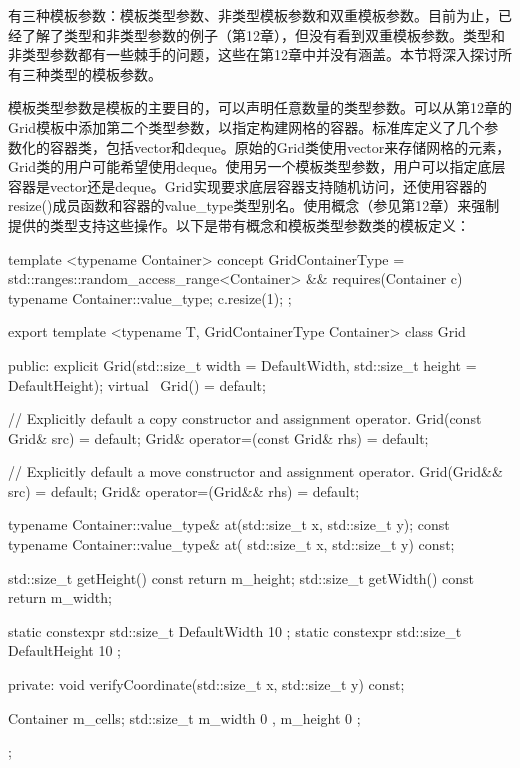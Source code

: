 
有三种模板参数：模板类型参数、非类型模板参数和双重模板参数。目前为止，已经了解了类型和非类型参数的例子（第12章），但没有看到双重模板参数。类型和非类型参数都有一些棘手的问题，这些在第12章中并没有涵盖。本节将深入探讨所有三种类型的模板参数。


模板类型参数是模板的主要目的，可以声明任意数量的类型参数。可以从第12章的Grid模板中添加第二个类型参数，以指定构建网格的容器。标准库定义了几个参数化的容器类，包括vector和deque。原始的Grid类使用vector来存储网格的元素，Grid类的用户可能希望使用deque。使用另一个模板类型参数，用户可以指定底层容器是vector还是deque。Grid实现要求底层容器支持随机访问，还使用容器的resize()成员函数和容器的value\_type类型别名。使用概念（参见第12章）来强制提供的类型支持这些操作。以下是带有概念和模板类型参数类的模板定义：

\begin{cpp}
template <typename Container>
concept GridContainerType =
    std::ranges::random_access_range<Container> &&
    requires(Container c) {
        typename Container::value_type;
        c.resize(1);
    };

export template <typename T, GridContainerType Container>
class Grid
{
    public:
        explicit Grid(std::size_t width = DefaultWidth,
            std::size_t height = DefaultHeight);
        virtual ~Grid() = default;

        // Explicitly default a copy constructor and assignment operator.
        Grid(const Grid& src) = default;
        Grid& operator=(const Grid& rhs) = default;

        // Explicitly default a move constructor and assignment operator.
        Grid(Grid&& src) = default;
        Grid& operator=(Grid&& rhs) = default;

        typename Container::value_type& at(std::size_t x, std::size_t y);
        const typename Container::value_type& at(
            std::size_t x, std::size_t y) const;

        std::size_t getHeight() const { return m_height; }
        std::size_t getWidth() const { return m_width; }

        static constexpr std::size_t DefaultWidth { 10 };
        static constexpr std::size_t DefaultHeight { 10 };

    private:
        void verifyCoordinate(std::size_t x, std::size_t y) const;

        Container m_cells;
        std::size_t m_width { 0 }, m_height { 0 };
};
\end{cpp}

